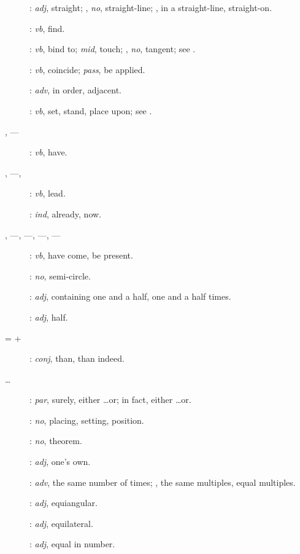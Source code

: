 {\begin{description}
\item[]: {\em adj}, straight; , {\em no}, straight-line; , in
a straight-line, straight-on.
\item[]:
{\em vb}, find.
\item[]: {\em vb}, bind to; {\em mid}, touch; , {\em no}, tangent; see .
\item[] : {\em vb}, coincide;  {\em pass},  be applied.
\item[]: {\em adv}, in order, adjacent.
\item[]: {\em vb}, set, stand, place upon; see .
\item[, ---]: {\em vb}, have.
\item[, ---, ]: {\em vb}, lead.
\item[]: {\em ind}, already, now.
\item[, ---,  ---, ---, ---]: {\em vb}, have come, be present.
\item[]: {\em no}, semi-circle.
\item[]: {\em adj}, containing one and a half, one and
a half times.
\item[]: {\em adj}, half.
\item[ =  + ]: {\em conj}, than, than indeed.
\item[ \ldots{}]: {\em par},   surely, either \ldots or; 
in fact, either \ldots or.
\item[]: {\em no}, placing, setting, position.
\item[]: {\em no}, theorem.
\item[]: {\em adj}, one's own.
\item[]: {\em adv}, the same number of times; , the same multiples, equal multiples.
\item[]: {\em adj}, equiangular.
\item[]: {\em adj}, equilateral.
\item[]: {\em adj}, equal in number.

\end{description}}

